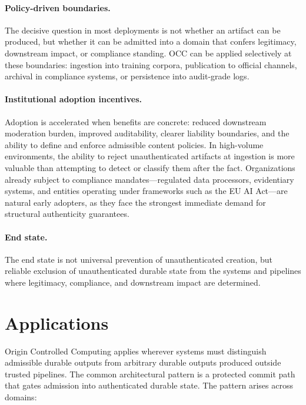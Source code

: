 \documentclass[11pt,letterpaper]{article}
\theoremstyle{occplain}
\theoremstyle{occremark}
\begin{document}
\paragraph{Policy-driven boundaries.}
The decisive question in most deployments is not whether an artifact can be produced, but whether it can be admitted into a domain that confers legitimacy, downstream impact, or compliance standing. OCC can be applied selectively at these boundaries: ingestion into training corpora, publication to official channels, archival in compliance systems, or persistence into audit-grade logs.

\paragraph{Institutional adoption incentives.}
Adoption is accelerated when benefits are concrete: reduced downstream moderation burden, improved auditability, clearer liability boundaries, and the ability to define and enforce admissible content policies. In high-volume environments, the ability to reject unauthenticated artifacts at ingestion is more valuable than attempting to detect or classify them after the fact. Organizations already subject to compliance mandates---regulated data processors, evidentiary systems, and entities operating under frameworks such as the EU AI Act---are natural early adopters, as they face the strongest immediate demand for structural authenticity guarantees.

\paragraph{End state.}
The end state is not universal prevention of unauthenticated creation, but reliable exclusion of unauthenticated durable state from the systems and pipelines where legitimacy, compliance, and downstream impact are determined.


\section{Applications}
\label{sec:applications}

Origin Controlled Computing applies wherever systems must distinguish admissible durable outputs from arbitrary durable outputs produced outside trusted pipelines. The common architectural pattern is a protected commit path that gates admission into authenticated durable state. The pattern arises across domains:
\end{document}

